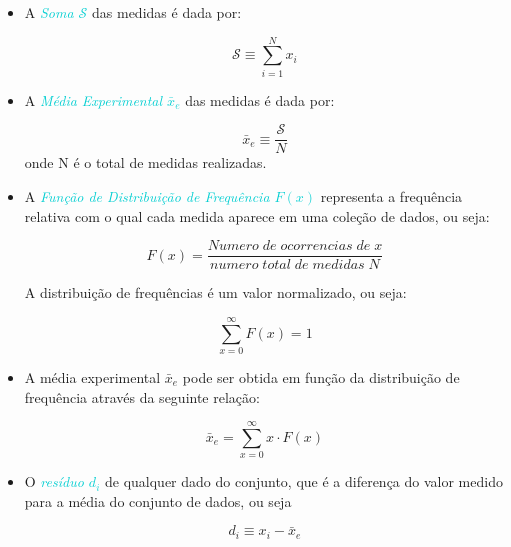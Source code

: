 \documentclass[11pt,a4paper]{article}
\begin{document}
        \begin{itemize}
            \item A \textit{\textcolor{DarkTurquoise}{Soma $\mathcal{S}$}} das medidas é dada por:
              
                \begin{equation}
                	\mathcal{S}  \equiv  \sum_{i = 1}^{N} x_i  
                \end{equation}

            \item A \textit{\textcolor{DarkTurquoise}{Média Experimental $\bar{x}_e$}} das medidas é dada por:
              
                	\begin{equation}
                  	\bar{x}_e \equiv  \frac{\mathcal{S}}{N}
                	\end{equation}
              		onde N é o total de medidas realizadas. 


            \item A \textit{\textcolor{DarkTurquoise}{Função de Distribuição de Frequência $F(x)$}} representa a frequência relativa com o qual cada medida aparece em uma coleção de dados, ou seja:
              
					\begin{equation}
					F(x) = \frac{Numero \; de \; ocorrencias \; de \;x}{numero \; total \; de \; medidas \; N}
					\end{equation}

					A distribuição de frequências é um valor normalizado, ou seja:

					\begin{equation}
					\sum_{x = 0}^{\infty} F(x) = 1 
					\end{equation}

			\item A média experimental $\bar{x}_e$ pode ser obtida em função da distribuição de frequência através da seguinte relação:
				
					\begin{equation}
						\bar{x}_e = \sum_{x = 0}^{\infty} x \cdot F(x)
					\end{equation}

			\item O \textit{\textcolor{DarkTurquoise}{resíduo $d_i$}} de qualquer dado do conjunto, que é a diferença do valor medido para a média do conjunto de dados, ou seja
				
					\begin{equation}
						d_i \equiv x_i - \bar{x}_e
					\end{equation}


\end{itemize}
\end{document}
